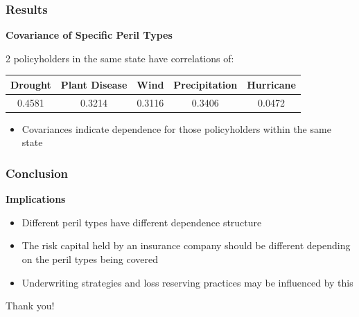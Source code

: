 \documentclass[serif,10pt,aspectratio=169]{beamer}
\begin{document}
\begin{frame}
\frametitle{Results}
\textbf{Covariance of Specific Peril Types}
\par 2 policyholders in the same state have correlations of:
\begin{center}
\par 
\begin{tabular}{||c|c|c|c|c||}
\hline
\textbf{Drought}& \textbf{Plant Disease}& \textbf{Wind} & \textbf{Precipitation} & \textbf{Hurricane}\\
\hline \hline
0.4581&  0.3214& 0.3116 & 0.3406 & 0.0472\\
\hline
\end{tabular}
\end{center}
\begin{itemize}
    \item Covariances indicate dependence for those policyholders within the same state
\end{itemize}
\end{frame}

\begin{frame}
\frametitle{Conclusion}
\textbf{Implications}
\begin{itemize}
    \item Different peril types have different dependence structure
    \item The risk capital held by an insurance company should be different depending on the peril types being covered
    \item Underwriting strategies and loss reserving practices may be influenced by this
\end{itemize}
\end{frame}


\begin{frame}
\Huge{\centerline{Thank you!}}
\end{frame}
\end{document}
